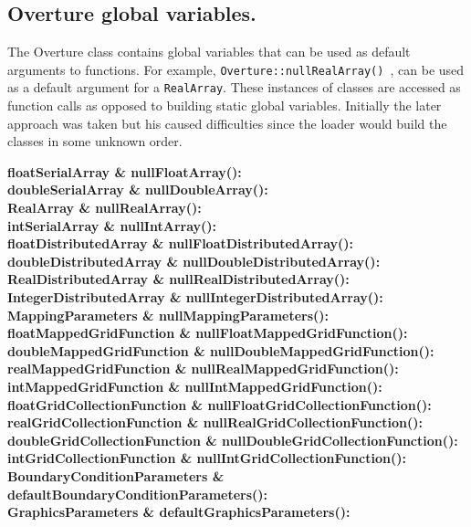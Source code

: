 \subsection{Overture global variables.}
 
\newlength{\OvertureIncludeArgIndent}
 
  The Overture class contains global variables that can be used as default arguments
  to functions. For example, {\tt Overture::nullRealArray() }, can be used as a default
  argument for a {\tt RealArray}. These instances of classes are accessed as function calls
  as opposed to building static global variables. Initially the later approach was taken
  but his caused difficulties since the loader would build the classes in some unknown order.

\begin{description}
\item[{\bf floatSerialArray \& nullFloatArray():}] 
\item[{\bf doubleSerialArray \& nullDoubleArray():}] 
\item[{\bf RealArray \& nullRealArray():}] 
\item[{\bf intSerialArray \& nullIntArray():}] 
	 
\item[{\bf floatDistributedArray \& nullFloatDistributedArray():}] 
\item[{\bf doubleDistributedArray \& nullDoubleDistributedArray():}] 
\item[{\bf RealDistributedArray \& nullRealDistributedArray():}] 
\item[{\bf IntegerDistributedArray \& nullIntegerDistributedArray():}] 
	 
\item[{\bf MappingParameters \& nullMappingParameters():}] 
	 
\item[{\bf floatMappedGridFunction \& nullFloatMappedGridFunction():}] 
\item[{\bf doubleMappedGridFunction \& nullDoubleMappedGridFunction():}] 
\item[{\bf realMappedGridFunction \& nullRealMappedGridFunction():}] 
\item[{\bf intMappedGridFunction \& nullIntMappedGridFunction():}] 
	 
\item[{\bf floatGridCollectionFunction \& nullFloatGridCollectionFunction():}] 
\item[{\bf realGridCollectionFunction \& nullRealGridCollectionFunction():}] 
\item[{\bf doubleGridCollectionFunction \& nullDoubleGridCollectionFunction():}] 
\item[{\bf intGridCollectionFunction \& nullIntGridCollectionFunction():}] 
	 
\item[{\bf BoundaryConditionParameters \& defaultBoundaryConditionParameters():}] 
\item[{\bf GraphicsParameters \& defaultGraphicsParameters():}] 

\end{description}
